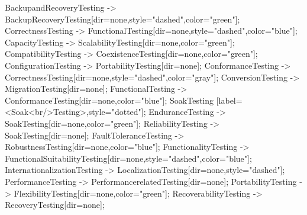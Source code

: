 \documentclass{article}
\begin{document}
{BackupandRecoveryTesting -> BackupRecoveryTesting[dir=none,style="dashed",color="green"];
CorrectnessTesting -> FunctionalTesting[dir=none,style="dashed",color="blue"];
CapacityTesting -> ScalabilityTesting[dir=none,color="green"];
CompatibilityTesting -> CoexistenceTesting[dir=none,color="green"];
ConfigurationTesting -> PortabilityTesting[dir=none];
ConformanceTesting -> CorrectnessTesting[dir=none,style="dashed",color="gray"];
ConversionTesting -> MigrationTesting[dir=none];
FunctionalTesting -> ConformanceTesting[dir=none,color="blue"];
SoakTesting [label=<Soak<br/>Testing>,style="dotted"];
EnduranceTesting -> SoakTesting[dir=none,color="green"];
ReliabilityTesting -> SoakTesting[dir=none];
FaultToleranceTesting -> RobustnessTesting[dir=none,color="blue"];
FunctionalityTesting -> FunctionalSuitabilityTesting[dir=none,style="dashed",color="blue"];
InternationalizationTesting -> LocalizationTesting[dir=none,style="dashed"];
PerformanceTesting -> PerformancerelatedTesting[dir=none];
PortabilityTesting -> FlexibilityTesting[dir=none,color="green"];
RecoverabilityTesting -> RecoveryTesting[dir=none];

}
\end{document}
